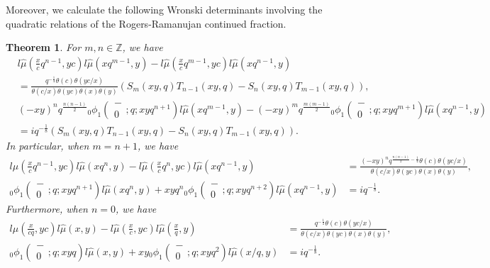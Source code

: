 \documentclass[a4paper]{article}
\newcommand{\Zz}{\mathbb{Z}}
\newcommand{\hyper}[4]{\left( \begin{matrix} #1 \\ #2 \end{matrix};#3;#4\right)}
\numberwithin{equation}{section}
\theoremstyle{plain}
\newtheorem{thm}{Theorem}
\begin{document}
Moreover, we calculate the following Wronski determinants involving the quadratic relations of the Rogers-Ramanujan continued fraction. 
\begin{thm}
\label{thm: lmu Wronskian}
For $m, n\in\Zz$, we have 
 \begin{align}
 &l\widehat{\mu}\left(\frac{x}{c}q^{n-1},yc\right)l\widehat{\mu}\left(xq^{m-1},y\right)
 -l\widehat{\mu}\left(\frac{x}{c}q^{m-1},yc\right)l\widehat{\mu}\left(xq^{n-1},y\right)
   \nonumber \\
 \label{eq: Wronskian relation 1}
 &=\frac{q^{-\frac{1}{4}}\theta(c)\theta(yc/x)}{\theta(c/x)\theta(yc)\theta(x)\theta(y)}\left(S_{m}(xy,q)T_{n-1}(xy,q)-S_n(xy,q)T_{m-1}(xy, q)\right), \\
 &(-xy)^nq^\frac{n(n-1)}{2}{}_0\phi_1\hyper{-}{0}{q}{xyq^{n+1}}l\widehat{\mu}\left(xq^{m-1},y\right)-(-xy)^mq^\frac{m(m-1)}{2}{}_0\phi_1\hyper{-}{0}{q}{xyq^{m+1}}l\widehat{\mu}\left(xq^{n-1},y\right)
   \nonumber \\
 \label{eq: Wronskian relation 2}
 &=iq^{-\frac{1}{8}}\left(S_{m}(xy,q)T_{n-1}(xy,q)-S_n(xy,q)T_{m-1}(xy, q)\right). 
 \end{align}
In particular, when $m=n+1$, we have
 \begin{align}
 \label{eq: n-Wronskian relation 1}
 l\widehat{\mu}\left(\frac{x}{c}q^{n-1},y c\right)l\widehat{\mu}\left(xq^{n},y\right)-l\widehat{\mu}\left(\frac{x}{c}q^{n},yc\right)l\widehat{\mu}\left(xq^{n-1},y\right)
   &=
   \frac{(-xy)^nq^{\frac{n(n-1)}{2}-\frac{1}{4}}\theta(c)\theta(yc/x)}{\theta(c/x)\theta(yc)\theta(x)\theta(y)}, \\
 \label{eq: n-Wronskian relation 2}
{}_0\phi_1\hyper{-}{0}{q}{xyq^{n+1}}l\widehat{\mu}\left(xq^n,y\right)+ xyq^n{}_0\phi_1\hyper{-}{0}{q}{xyq^{n+2}}l\widehat{\mu}\left(xq^{n-1},y\right)&=iq^{-\frac{1}{8}}. 
 \end{align}
Furthermore, when $n=0$, we have
\begin{align}
\label{eq: lmu Wronskian 1}
l\widehat{\mu}\left(\frac{x}{cq},yc\right)l\widehat{\mu}\left(x,y\right)-l\widehat{\mu}\left(\frac{x}{c},yc\right)l\widehat{\mu}\left(\frac{x}{q},y\right)
  &=
  \frac{q^{-\frac{1}{4}}\theta(c)\theta(yc/x)}{\theta(c/x)\theta(yc)\theta(x)\theta(y)}, \\
\label{eq: lmu Wronskian 2}
{}_0\phi_1\hyper{-}{0}{q}{xyq}l\widehat{\mu}(x,y)+xy{}_0\phi_1\hyper{-}{0}{q}{xyq^2}l\widehat{\mu}(x/q,y)
  &=
  iq^{-\frac{1}{8}}. 
\end{align}
\end{thm}
\end{document}
